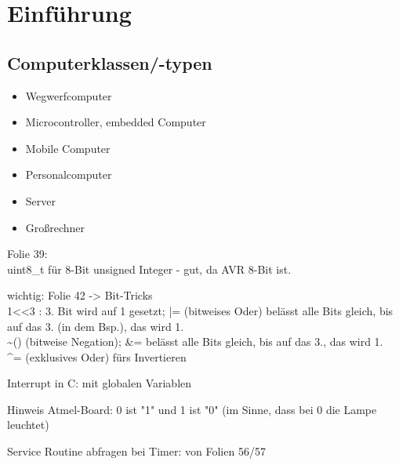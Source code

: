 \chapter{Einführung}

\section{Computerklassen/-typen}
\begin{itemize}
\item Wegwerfcomputer
\item Microcontroller, embedded Computer
\item Mobile Computer
\item Personalcomputer
\item Server
\item Großrechner
\end{itemize}


Folie 39: \\
uint8\_t für 8-Bit unsigned Integer - gut, da AVR 8-Bit ist.

wichtig: Folie 42 -> Bit-Tricks\\
1<<3 : 3. Bit wird auf 1 gesetzt; |= (bitweises Oder) belässt alle Bits gleich, bis auf das 3. (in dem Bsp.), das wird 1.\\
\textasciitilde() (bitweise Negation); \&= belässt alle Bits gleich, bis auf das 3., das wird 1.\\
\^{}= (exklusives Oder) fürs Invertieren


Interrupt in C: mit globalen Variablen

Hinweis Atmel-Board: 0 ist "1" und 1 ist "0" (im Sinne, dass bei 0 die Lampe leuchtet)

Service Routine abfragen bei Timer: von Folien 56/57





